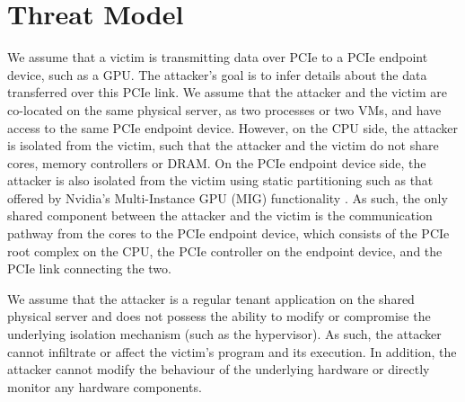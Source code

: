 \section{Threat Model}
\label{sec:interconnect-sc-threat-model}

We assume that a victim is transmitting data over PCIe to a PCIe endpoint device, such as a GPU.
The attacker's goal is to infer details about the data transferred over this PCIe link.
We assume that the attacker and the victim are co-located on the same physical server, as two processes or two VMs, and have access to the same PCIe endpoint device.
However, on the CPU side, the attacker is isolated from the victim, such that the attacker and the victim do not share cores, memory controllers or DRAM.
On the PCIe endpoint device side, the attacker is also isolated from the victim using static partitioning such as that offered by Nvidia's Multi-Instance GPU (MIG) functionality \cite{nvidia_mig_guide}.
As such, the only shared component between the attacker and the victim is the communication pathway from the cores to the PCIe endpoint device, which consists of the PCIe root complex on the CPU, the PCIe controller on the endpoint device, and the PCIe link connecting the two.

We assume that the attacker is a regular tenant application on the shared physical server and does not possess the ability to modify or compromise the underlying isolation mechanism (such as the hypervisor).
As such, the attacker cannot infiltrate or affect the victim's program and its execution.
In addition, the attacker cannot modify the behaviour of the underlying hardware or directly monitor any hardware components.
